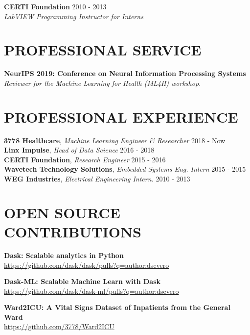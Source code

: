 \documentclass[margin, line]{res}
\begin{document}
\begin{resume}
\textbf{CERTI Foundation} \hfill 2010 - 2013\\
{\sl LabVIEW Programming Instructor for Interns}

\section{PROFESSIONAL SERVICE}
\textbf{NeurIPS 2019: Conference on Neural Information Processing Systems}\\
{\sl Reviewer for the Machine Learning for Health (ML4H) workshop.}

\section{PROFESSIONAL EXPERIENCE}
\textbf{3778 Healthcare}, {\sl Machine Learning Engineer \& Researcher} \hfill 2018 - Now\\
\textbf{Linx Impulse}, {\sl Head of Data Science} \hfill 2016 - 2018\\
\textbf{CERTI Foundation}, {\sl Research Engineer} \hfill 2015 - 2016\\
\textbf{Wavetech Technology Solutions}, {\sl Embedded Systems Eng. Intern} \hfill 2015 - 2015\\
\textbf{WEG Industries}, {\sl Electrical Engineering Intern.} \hfill 2010 - 2013

\section{OPEN SOURCE CONTRIBUTIONS}
\textbf{Dask: Scalable analytics in Python}\\
\url{https://github.com/dask/dask/pulls?q=author:dsevero}

\textbf{Dask-ML: Scalable Machine Learn with Dask}\\
\url{https://github.com/dask/dask-ml/pulls?q=author:dsevero}

\textbf{Ward2ICU: A Vital Signs Dataset of Inpatients from the General Ward}\\
\url{https://github.com/3778/Ward2ICU}

\end{resume}
\(\)
\end{document}
